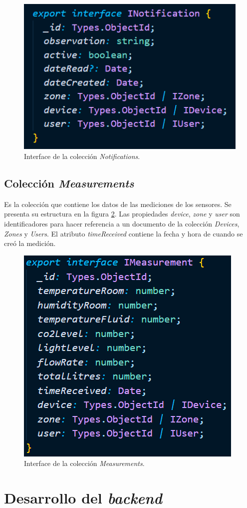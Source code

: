 \begin{figure}[H]
	\centering
	\includegraphics[width=.5\textwidth]{./Figures/Coleccion Notifications.png}
	\caption{Interface de la colección \textit{Notifications}.}
	\label{fig:coleccionNotifications}
\end{figure}

\subsection{Colección \textit{Measurements}}

Es la colección que contiene los datos de las mediciones de los sensores. Se presenta su estructura en la figura \ref{fig:coleccionMeasurements}. Las propiedades \textit{device}, \textit{zone} y \textit{user} son identificadores para hacer referencia a un documento de la colección \textit{Devices}, \textit{Zones} y \textit{Users}. El atributo \textit{timeReceived} contiene la fecha y hora de cuando se creó la medición.

\begin{figure}[H]
	\centering
	\includegraphics[width=.5\textwidth]{./Figures/Coleccion Measurements.png}
	\caption{Interface de la colección \textit{Measurements}.}
	\label{fig:coleccionMeasurements}
\end{figure}

\section{Desarrollo del \emph{backend}}

